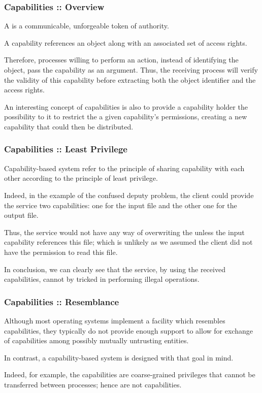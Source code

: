 \begin{frame}
  \frametitle{Capabilities :: Overview}

  A  is a communicable, unforgeable token of authority.

  \-

  A capability references an object along with an associated set of access
  rights.

  \-

  Therefore, processes willing to perform an action, instead of identifying
  the object, pass the capability as an argument. Thus, the receiving process
  will verify the validity of this capability before extracting both
  the object identifier and the access rights.

  \-

  An interesting concept of capabilities is also to provide a capability
  holder the possibility to  it \ie{} to restrict the
  a given capability's permissions, creating a new capability that could
  then be distributed.
\end{frame}


\begin{frame}
  \frametitle{Capabilities :: Least Privilege}

  Capability-based system refer to the principle of sharing capability with
  each other according to the principle of least privilege.

  \-

  Indeed, in the example of the confused deputy problem, the client could
  provide the service two capabilities: one for the input file and the other
  one for the output file.

  \-

  Thus, the service would not have any way of overwriting the
   unless the input capability references this file;
  which is unlikely as we assumed the client did not have the permission
  to read this file.

  \-

  In conclusion, we can clearly see that the service, by using the received
  capabilities, cannot by tricked in performing illegal operations.
\end{frame}


\begin{frame}
  \frametitle{Capabilities :: Resemblance}

  Although most operating systems implement a facility which resembles
  capabilities, they typically do not provide enough support to allow
  for exchange of capabilities among possibly mutually untrusting entities.

  \-

  In contrast, a capability-based system is designed with that goal in mind.

  \-

  Indeed, for example, the  capabilities are coarse-grained
  privileges that cannot be transferred between processes; hence are not
  capabilities.
\end{frame}

